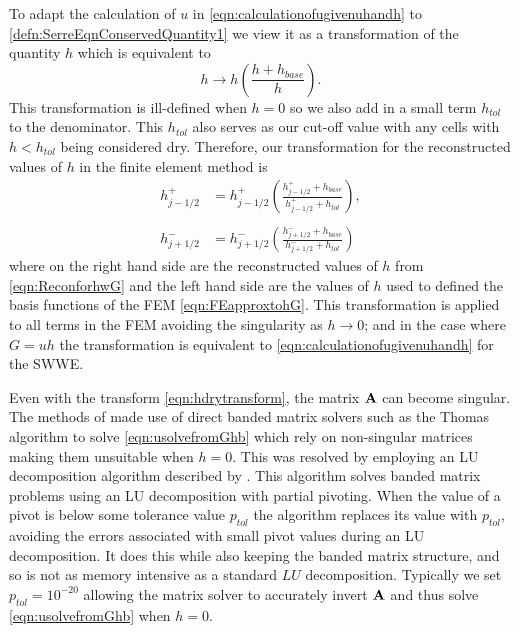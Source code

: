 To adapt the calculation of $u$ in \eqref{eqn:calculationofugivenuhandh} to \eqref{defn:SerreEqnConservedQuantity1} we view it as a transformation of the quantity $h$ which is equivalent to
\begin{equation}
h \rightarrow h \left( \frac{h + h_{base}}{h} \right).
\end{equation}
This transformation is ill-defined when $h = 0$ so we also add in a  small term $h_{tol}$ to the denominator. This $h_{tol}$ also serves as our cut-off value with any cells with $h < h_{tol}$ being considered dry. Therefore, our transformation for the reconstructed values of $h$ in the finite element method is
\begin{subequations}
	\begin{align}
	h^+_{j-1/2} & = h^+_{j-1/2} \left(\frac{ h^+_{j-1/2}  + h_{base}}{h^+_{j-1/2} + h_{tol}}\right) , \\ \nonumber\\
	h^-_{j+1/2} & = h^-_{j+1/2} \left(\frac{ h^-_{j+1/2}  + h_{base}}{h^-_{j+1/2} + h_{tol}}\right)
	\end{align} 
	\label{eqn:hdrytransform}
\end{subequations}
where on the right hand side are the reconstructed values of $h$ from \eqref{eqn:ReconforhwG} and the left hand side are the values of $h$ used to defined the basis functions of the FEM \eqref{eqn:FEapproxtohG}. This transformation is applied to all terms in the FEM avoiding the singularity as $h \rightarrow 0$; and in the case where $G = uh$ the transformation is equivalent to \eqref{eqn:calculationofugivenuhandh} for the SWWE.

Even with the transform \eqref{eqn:hdrytransform}, the matrix $\mathbf{A}$ can become singular.
The methods of \citet{Zoppou-etal-2017} made use of direct banded matrix solvers such as the Thomas algorithm \cite{Conte-DeBoor-1980} to solve \eqref{eqn:usolvefromGhb} which rely on non-singular matrices making them unsuitable when $h = 0$. This was resolved by employing an LU decomposition algorithm described by \citet{NumRecC-1996}. This algorithm solves banded matrix problems using an LU decomposition with partial pivoting. When the value of a pivot is below some tolerance value $p_{tol}$ the algorithm replaces its value with $p_{tol}$, avoiding the errors associated with small pivot values during an LU decomposition. It does this while also keeping the banded matrix structure, and so is not as memory intensive as a standard $LU$ decomposition. Typically we set $p_{tol} = 10^{-20}$ allowing the matrix solver to accurately invert $\mathbf{A}$ and thus solve \eqref{eqn:usolvefromGhb} when $h = 0$. 

